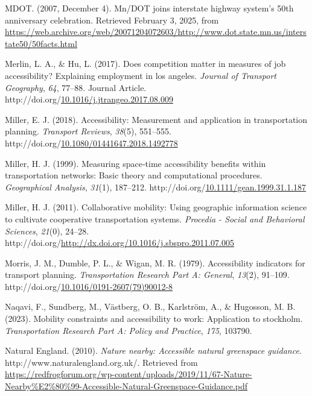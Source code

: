 \documentclass[
11pt, %
oneside, %
english, %
singlespacing, %
]{macthesis} %
\newlength{\cslhangindent}
\newenvironment{CSLReferences}[2] %
{\begin{list}{}{%
	\setlength{\itemindent}{0pt}
	\setlength{\leftmargin}{0pt}
	\setlength{\parsep}{0pt}
	\ifodd #1
	\setlength{\leftmargin}{\cslhangindent}
	\setlength{\itemindent}{-1\cslhangindent}
	\fi
	\setlength{\itemsep}{#2\baselineskip}}}
{\end{list}}
\begin{document}
\begin{CSLReferences}{1}{0}
MDOT. (2007, December 4). Mn/{DOT} joins interstate highway system's 50th anniversary celebration. Retrieved February 3, 2025, from \url{https://web.archive.org/web/20071204072603/http://www.dot.state.mn.us/interstate50/50facts.html}

Merlin, L. A., \& Hu, L. (2017). Does competition matter in measures of job accessibility? Explaining employment in los angeles. \emph{Journal of Transport Geography}, \emph{64}, 77--88. Journal Article. http://doi.org/\href{https://doi.org/10.1016/j.jtrangeo.2017.08.009}{10.1016/j.jtrangeo.2017.08.009}

Miller, E. J. (2018). Accessibility: Measurement and application in transportation planning. \emph{Transport Reviews}, \emph{38}(5), 551--555. http://doi.org/\href{https://doi.org/10.1080/01441647.2018.1492778}{10.1080/01441647.2018.1492778}

Miller, H. J. (1999). Measuring space‐time accessibility benefits within transportation networks: Basic theory and computational procedures. \emph{Geographical Analysis}, \emph{31}(1), 187--212. http://doi.org/\href{https://doi.org/10.1111/gean.1999.31.1.187}{10.1111/gean.1999.31.1.187}

Miller, H. J. (2011). Collaborative mobility: Using geographic information science to cultivate cooperative transportation systems. \emph{Procedia - Social and Behavioral Sciences}, \emph{21}(0), 24--28. http://doi.org/\url{http://dx.doi.org/10.1016/j.sbspro.2011.07.005}

Morris, J. M., Dumble, P. L., \& Wigan, M. R. (1979). Accessibility indicators for transport planning. \emph{Transportation Research Part A: General}, \emph{13}(2), 91--109. http://doi.org/\href{https://doi.org/10.1016/0191-2607(79)90012-8}{10.1016/0191-2607(79)90012-8}

Naqavi, F., Sundberg, M., Västberg, O. B., Karlström, A., \& Hugosson, M. B. (2023). Mobility constraints and accessibility to work: Application to stockholm. \emph{Transportation Research Part A: Policy and Practice}, \emph{175}, 103790.

Natural England. (2010). \emph{Nature nearby: Accessible natural greenspace guidance}. http://www.naturalengland.org.uk/. Retrieved from \url{https://redfrogforum.org/wp-content/uploads/2019/11/67-Nature-Nearby\%E2\%80\%99-Accessible-Natural-Greenspace-Guidance.pdf}


\end{CSLReferences}
\end{document}
